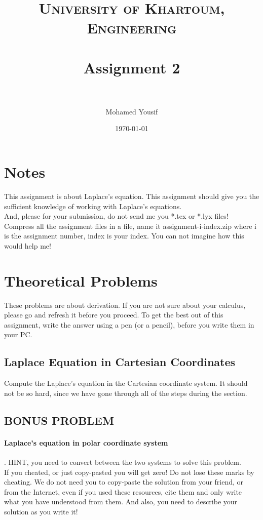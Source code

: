\documentclass[paper=a4, fontsize=11pt]{scrartcl} %
\title{	
\normalfont \normalsize 
\textsc{University of Khartoum, Engineering} \\ [25pt] %
\horrule{0.5pt} \\[0.4cm] %
\huge Assignment 2 \\ %
\horrule{2pt} \\[0.5cm] %
}
\author{Mohamed Yousif} %
\date{\normalsize\today} %
\numberwithin{equation}{section} %
\numberwithin{figure}{section} %
\numberwithin{table}{section} %
\begin{document}
\maketitle %


\section*{Notes}
This assignment is about Laplace's equation. This assignment should give you the sufficient knowledge of working with Laplace's equations.\\
And, please for your submission, do not send me you *.tex or *.lyx files! Compress all the assignment files in a file, name it assignment-i-index.zip where i is the assignment number, index is your index. You can not imagine how this would help me!



\section{Theoretical Problems}
These problems are about derivation. If you are not sure about your calculus, please go and refresh it before you proceed. To get the best out of this assignment, write the answer using a pen (or a pencil), before you write them in your PC.

\subsection{Laplace Equation in Cartesian Coordinates}

Compute the Laplace's equation in the Cartesian coordinate system. It should not be so hard, since we have gone through all of the steps during the section.

\subsection{BONUS PROBLEM}
\paragraph{Laplace's equation in polar coordinate system}. HINT, you need to convert between the two systems to solve this problem.
\\
If you cheated, or just copy-pasted you will get zero! Do not lose these marks by cheating. We do not need you to copy-paste the solution from your friend, or from the Internet, even if you used these resources, cite them and only write what you have understood from them. And also, you need to describe your solution as you write it!
\end{document}
